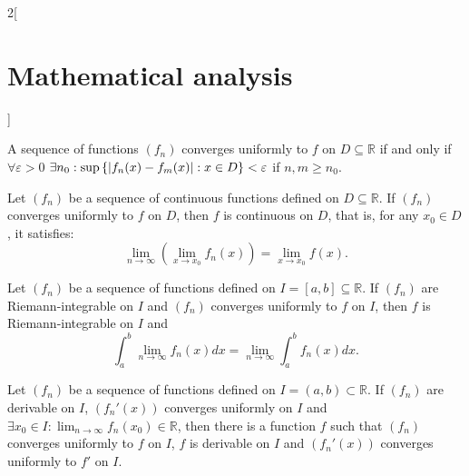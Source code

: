 \documentclass[class=article,crop=false]{standalone}
\begin{document}
\begin{multicols}{2}[\section{Mathematical analysis}]
\begin{theorem}
A sequence of functions $(f_n)$ converges uniformly to $f$ on $D\subseteq\mathbb{R}$ if and only if $\forall\varepsilon>0$ $\displaystyle\exists n_0:\sup\left\{|f_n(x)-f_m(x)|:\\ x\in D\right\}< \varepsilon$ if $n,m\geq n_0$.
\end{theorem}
\begin{theorem}
Let $(f_n)$ be a sequence of continuous functions defined on $D\subseteq\mathbb{R}$. If $(f_n)$ converges uniformly to $f$ on $D$, then $f$ is continuous on $D$, that is, for any $x_0\in D$, it satisfies: $$\lim_{n\to\infty}\left(\lim_{x\to x_0} f_n(x)\right)=\lim_{x\to x_0} f(x).$$
\end{theorem}
\begin{theorem}
Let $(f_n)$ be a sequence of functions defined on  $I=[a,b]\subseteq\mathbb{R}$. If $(f_n)$ are Riemann-integrable on $I$ and $(f_n)$ converges uniformly to $f$ on $I$, then $f$ is Riemann-integrable on $I$ and $$\int_a^b\lim_{n\to\infty} f_n(x) dx=\lim_{n\to\infty} \int_a^bf_n(x) dx.$$
\end{theorem}
\begin{theorem}
Let $(f_n)$ be a sequence of functions defined on $I=(a,b)\subset\mathbb{R}$. If $(f_n)$ are derivable on $I$, $(f_n'(x))$ converges uniformly on $I$ and $\displaystyle\exists x_0\in I: \lim_{n\to\infty}f_n(x_0)\in\mathbb{R}$, then there is a function $f$ such that $(f_n)$ converges uniformly to $f$ on $I$, $f$ is derivable on $I$ and $(f_n'(x))$ converges uniformly to $f'$ on $I$.
\end{theorem}

\end{multicols}
\end{document}
